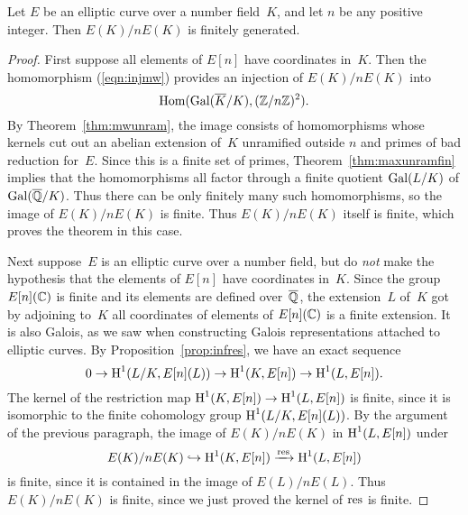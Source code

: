 \begin{theorem}\label{thm:weakMW}
	Let $E$ be an elliptic curve over a number field~$K$, and
	let $n$ be any positive integer.  Then
	$E(K)/nE(K)$ is finitely generated.
\end{theorem}
\begin{proof}
	First suppose all elements of $E[n]$ have coordinates in~$K$.  Then
	the homomorphism (\ref{eqn:injmw}) provides an injection of $E(K)/n
	E(K)$ into
	$$
		\operatorname{Hom}(\operatorname{Gal}(\overline{K}/K), (\mathbb{Z}/n\mathbb{Z})^2).
	$$
	By Theorem~\ref{thm:mwunram}, the image consists of homomorphisms whose
	kernels cut out an abelian extension of~$K$ unramified outside $n$
	and primes of bad reduction for~$E$.  Since this is a finite set of
	primes, Theorem~\ref{thm:maxunramfin} implies that the homomorphisms
	all factor through a finite quotient $\operatorname{Gal}(L/K)$ of $\operatorname{Gal}(\overline{\mathbb{Q}}/K)$.
	Thus there can be only finitely many such homomorphisms, so the
	image of $E(K)/nE(K)$ is finite.  Thus $E(K)/nE(K)$ itself is
	finite, which proves the theorem in this case.
	
	Next suppose~$E$ is an elliptic curve over a number field, but do {\em
	not} make the hypothesis that the elements of $E[n]$ have
	coordinates in~$K$.  Since the group $E[n](\mathbb{C})$ is finite and its
	elements are defined over~$\overline{\mathbb{Q}}$, the extension~$L$ of~$K$ got by
	adjoining to~$K$ all coordinates of elements of $E[n](\mathbb{C})$ is a finite
	extension.  It is also Galois, as we saw when constructing Galois
	representations attached to elliptic curves.
	By Proposition~\ref{prop:infres}, we have an exact sequence
	$$
		0 \to \operatorname{H}^1(L/K, E[n](L))\to   \operatorname{H}^1(K,E[n])\to \operatorname{H}^1(L,E[n]).
	$$
	The kernel of the restriction map
	$\operatorname{H}^1(K,E[n])\to \operatorname{H}^1(L,E[n])$ is finite, since it is
	isomorphic to the finite cohomology group
	$\operatorname{H}^1(L/K, E[n](L))$.  By the argument of the previous
	paragraph, the image of $E(K)/nE(K)$ in $\operatorname{H}^1(L,E[n])$
	under
	$$
		E(K)/n E(K) \hookrightarrow \operatorname{H}^1(K,E[n]) \xrightarrow{\operatorname{res}} \operatorname{H}^1(L,E[n])
	$$
	is finite, since it is contained in the image of $E(L)/n E(L)$.
	Thus $E(K)/n E(K)$ is finite, since we just proved
	the kernel of $\operatorname{res}$ is finite.
\end{proof}



